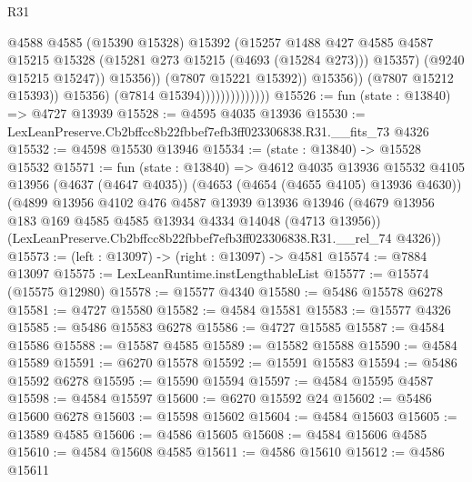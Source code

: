 \begin{lexlean}{R31}
\begin{coremodule}
                                              @4588
                                              @4585
                                              (@15390 @15328)
                                              @15392
                                              (@15257
                                                @1488
                                                @427
                                                @4585
                                                @4587
                                                @15215
                                                @15328
                                                (@15281 @273 @15215 (@4693 (@15284 @273)))
                                                @15357)
                                              (@9240 @15215 @15247))
                                            @15356))
                                        (@7807 @15221 @15392))
                                      @15356))
                                  (@7807 @15212 @15393))
                                @15356)
                              (@7814 @15394))))))))))))))
@15526 := fun (state : @13840) => @4727 @13939
@15528 := @4595 @4035 @13936
@15530 := LexLeanPreserve.Cb2bffcc8b22fbbef7efb3ff023306838.R31.__fits_73 @4326
@15532 := @4598 @15530 @13946
@15534 := (state : @13840) -> @15528 @15532
@15571 := fun (state : @13840) =>
  @4612
    @4035
    @13936
    @15532
    @4105
    @13956
    (@4637 (@4647 @4035))
    (@4653 (@4654 (@4655 @4105) @13936 @4630))
    (@4899
      @13956
      @4102
      @476
      @4587
      @13939
      @13936
      @13946
      (@4679 @13956 @183 @169 @4585 @4585 @13934 @4334 @14048 (@4713 @13956))
      (LexLeanPreserve.Cb2bffcc8b22fbbef7efb3ff023306838.R31.__rel_74 @4326))
@15573 := (left : @13097) -> (right : @13097) -> @4581
@15574 := @7884 @13097
@15575 := LexLeanRuntime.instLengthableList
@15577 := @15574 (@15575 @12980)
@15578 := @15577 @4340
@15580 := @5486 @15578 @6278
@15581 := @4727 @15580
@15582 := @4584 @15581
@15583 := @15577 @4326
@15585 := @5486 @15583 @6278
@15586 := @4727 @15585
@15587 := @4584 @15586
@15588 := @15587 @4585
@15589 := @15582 @15588
@15590 := @4584 @15589
@15591 := @6270 @15578
@15592 := @15591 @15583
@15594 := @5486 @15592 @6278
@15595 := @15590 @15594
@15597 := @4584 @15595 @4587
@15598 := @4584 @15597
@15600 := @6270 @15592 @24
@15602 := @5486 @15600 @6278
@15603 := @15598 @15602
@15604 := @4584 @15603
@15605 := @13589 @4585
@15606 := @4586 @15605
@15608 := @4584 @15606 @4585
@15610 := @4584 @15608 @4585
@15611 := @4586 @15610
@15612 := @4586 @15611

\end{coremodule}
\end{lexlean}
